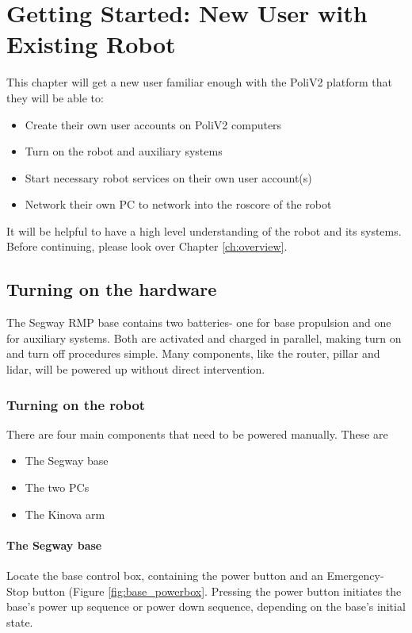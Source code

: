 \chapter{Getting Started: New User with Existing Robot}\label{ch:getting_started}

This chapter will get a new user familiar enough with the PoliV2 platform that they will be able to:
\begin{itemize}
\item Create their own user accounts on PoliV2 computers
\item Turn on the robot and auxiliary systems
\item Start necessary robot services on their own user account(s)
\item Network their own PC to network into the roscore of the robot
\end{itemize}
It will be helpful to have a high level understanding of the robot and its systems. Before continuing, please look over Chapter \ref{ch:overview}.



\section{Turning on the hardware} \label{sec:turn_on_hardware}
The Segway RMP base contains two batteries- one for base propulsion and one for auxiliary systems. Both are activated and charged in parallel, making turn on and turn off procedures simple. Many components, like the router, pillar and lidar, will be powered up without direct intervention.

\subsection{Turning on the robot}
There are four main components that need to be powered manually. These are 
\begin{itemize}
	\item The Segway base
    \item The two PCs
    \item The Kinova arm
\end{itemize}

\subsubsection{The Segway base}
Locate the base control box, containing the power button and an Emergency-Stop button (Figure \ref{fig:base_powerbox}. Pressing the power button initiates the base's power up sequence or power down sequence, depending on the base's initial state.

